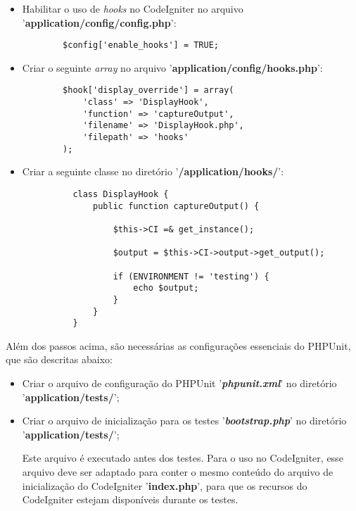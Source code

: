 	  \begin{itemize}
	  
	   \item Habilitar o uso de \textit{hooks} no CodeIgniter no arquivo '\textbf{application/config/config.php}':
	      
	      \begin{verbatim}
		$config['enable_hooks'] = TRUE;
	      \end{verbatim}
	      
	   \vfill
	   \pagebreak
	   \item Criar o seguinte \textit{array} no arquivo '\textbf{application/config/hooks.php}':
	  
	      \begin{lstlisting}
		$hook['display_override'] = array(
		    'class' => 'DisplayHook',
		    'function' => 'captureOutput',
		    'filename' => 'DisplayHook.php',
		    'filepath' => 'hooks'
		);
	      \end{lstlisting}
	   
	   \item Criar a seguinte classe no diretório '\textbf{/application/hooks/}':
	  
	  \begin{lstlisting}
	      class DisplayHook {
	          public function captureOutput() {

	              $this->CI =& get_instance();
			  
	              $output = $this->CI->output->get_output();

	              if (ENVIRONMENT != 'testing') {
	                  echo $output;
	              }
	          }
	      }
	  \end{lstlisting}
	  
	  \end{itemize}
	  
	  Além dos passos acima, são necessárias as configurações essenciais do PHPUnit, que são descritas abaixo:
	  
	  \begin{itemize}
	    \item Criar o arquivo de configuração do PHPUnit '\textbf{\textit{phpunit.xml}}' 
		  no diretório '\textbf{application/tests/}';
	    
	    \item Criar o arquivo de inicialização para os testes '\textbf{\textit{bootstrap.php}}'
		  no diretório '\textbf{application/tests/}';
	      
		\subitem Este arquivo é executado antes dos testes. Para o uso no CodeIgniter, esse arquivo deve ser
			 adaptado para conter o mesmo conteúdo do arquivo de inicialização do CodeIgniter '\textbf{index.php}', 
			 para que os recursos do CodeIgniter estejam disponíveis durante os testes.
	  \end{itemize}
	  
